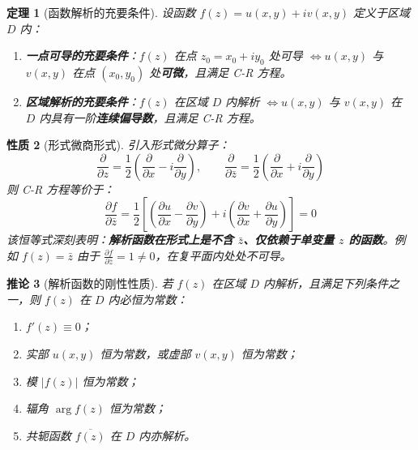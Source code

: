 \documentclass[11pt,a4paper,fontset=fandol]{ctexart}
\newtheorem{theorem}{定理}[section]
\newtheorem{property}[theorem]{性质}
\newtheorem{corollary}[theorem]{推论}
\theoremstyle{remark}
\begin{document}
\begin{theorem}[函数解析的充要条件]
设函数 $f(z) = u(x, y) + i v(x, y)$ 定义于区域 $D$ 内：
\begin{enumerate}
    \item \textbf{一点可导的充要条件}：$f(z)$ 在点 $z_0 = x_0 + iy_0$ 处可导 $\iff u(x, y)$ 与 $v(x, y)$ 在点 $(x_0, y_0)$ 处\textbf{可微}，且满足 C-R 方程。
    \item \textbf{区域解析的充要条件}：$f(z)$ 在区域 $D$ 内解析 $\iff u(x, y)$ 与 $v(x, y)$ 在 $D$ 内具有一阶\textbf{连续偏导数}，且满足 C-R 方程。
\end{enumerate}
\end{theorem}

\begin{property}[形式微商形式]
引入形式微分算子：
\begin{equation}
    \frac{\partial}{\partial z} = \frac{1}{2}\left(\frac{\partial}{\partial x} - i\frac{\partial}{\partial y}\right), \qquad \frac{\partial}{\partial \bar{z}} = \frac{1}{2}\left(\frac{\partial}{\partial x} + i\frac{\partial}{\partial y}\right)
\end{equation}
则 C-R 方程等价于：
\begin{equation}
    \frac{\partial f}{\partial \bar{z}} = \frac{1}{2}\left[ \left(\frac{\partial u}{\partial x} - \frac{\partial v}{\partial y}\right) + i\left(\frac{\partial v}{\partial x} + \frac{\partial u}{\partial y}\right) \right] = 0
\end{equation}
该恒等式深刻表明：\textbf{解析函数在形式上是不含 $\bar{z}$、仅依赖于单变量 $z$ 的函数}。例如 $f(z) = \bar{z}$ 由于 $\frac{\partial f}{\partial \bar{z}} = 1 \neq 0$，在复平面内处处不可导。
\end{property}

\begin{corollary}[解析函数的刚性性质]
若 $f(z)$ 在区域 $D$ 内解析，且满足下列条件之一，则 $f(z)$ 在 $D$ 内必恒为常数：
\begin{enumerate}
    \item $f'(z) \equiv 0$；
    \item 实部 $u(x, y)$ 恒为常数，或虚部 $v(x, y)$ 恒为常数；
    \item 模 $|f(z)|$ 恒为常数；
    \item 辐角 $\arg f(z)$ 恒为常数；
    \item 共轭函数 $\overline{f(z)}$ 在 $D$ 内亦解析。
\end{enumerate}
\end{corollary}
\end{document}
